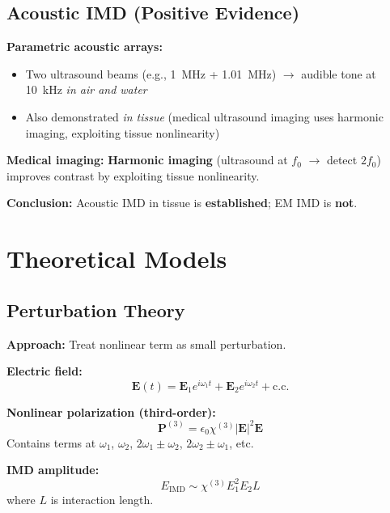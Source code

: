 \subsection{Acoustic IMD (Positive Evidence)}

\textbf{Parametric acoustic arrays:}
\begin{itemize}
\item Two ultrasound beams (e.g., 1~MHz + 1.01~MHz) $\rightarrow$ audible tone at 10~kHz \emph{in air and water}
\item Also demonstrated \emph{in tissue} (medical ultrasound imaging uses harmonic imaging, exploiting tissue nonlinearity)
\end{itemize}

\textbf{Medical imaging:} \textbf{Harmonic imaging} (ultrasound at $f_0$ $\rightarrow$ detect $2f_0$) improves contrast by exploiting tissue nonlinearity.

\begin{keyconcept}
\textbf{Conclusion:} Acoustic IMD in tissue is \textbf{established}; EM IMD is \textbf{not}.
\end{keyconcept}

\section{Theoretical Models}

\subsection{Perturbation Theory}

\textbf{Approach:} Treat nonlinear term as small perturbation.

\textbf{Electric field:}
\begin{equation}
\label{eq:electric-field-two-tone}
\mathbf{E}(t) = \mathbf{E}_1 e^{i\omega_1 t} + \mathbf{E}_2 e^{i\omega_2 t} + \text{c.c.}
\end{equation}

\textbf{Nonlinear polarization (third-order):}
\begin{equation}
\label{eq:nonlinear-polarization}
\mathbf{P}^{(3)} = \epsilon_0 \chi^{(3)} |\mathbf{E}|^2 \mathbf{E}
\end{equation}
Contains terms at $\omega_1$, $\omega_2$, $2\omega_1 \pm \omega_2$, $2\omega_2 \pm \omega_1$, etc.

\textbf{IMD amplitude:}
\begin{equation}
\label{eq:imd-amplitude}
E_{\text{IMD}} \sim \chi^{(3)} E_1^2 E_2 L
\end{equation}
where $L$ is interaction length.


